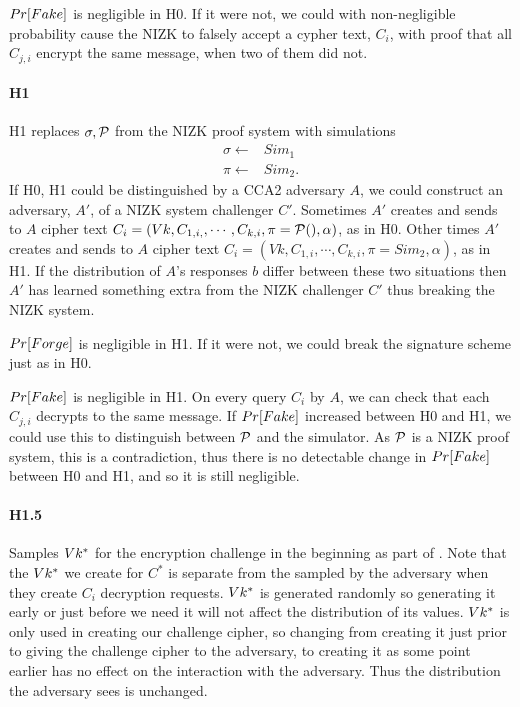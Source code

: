 $Pr[Fake]$ is negligible in H0. If it were not, we could with non-negligible probability cause the NIZK \Verify
to falsely accept a cypher text, $C_i$, with proof that all $C_{j,i}$ encrypt the same message, when two of them did not.


\paragraph{H1} H1 replaces $\sigma, \mathcal{P}$ from the NIZK proof system with simulations
\begin{align*}
\sigma \leftarrow & Sim_1 \\
\pi        \leftarrow & Sim_2.
\end{align*}
If H0, H1 could be distinguished by a CCA2 adversary $A$,
we could construct an adversary, $A'$, of a NIZK system challenger $C'$.
Sometimes $A'$ creates and sends to $A$ cipher text $C_i = (Vk, C_{1,i,}, \cdots, C_{k,i}, \pi = \mathcal{P}(), \alpha)$, as in H0.
Other times $A'$ creates and sends to $A$ cipher text $C_i = (Vk, C_{1,i}, \cdots, C_{k,i}, \pi = Sim_2, \alpha)$, as in H1.
If the distribution of $A$'s responses $b$ differ between these two situations then $A'$
has learned something extra from the NIZK challenger $C'$ thus breaking the NIZK system.

$Pr[Forge]$ is negligible in H1. If it were not,
we could break the signature scheme just as in H0.

$Pr[Fake]$  is negligible in H1.
On every query $C_i$ by $A$, we can check that each $C_{j,i}$ decrypts to the same message.
If $Pr[Fake]$ increased between H0 and H1, we could use this to distinguish between $\mathcal{P}$ and the simulator.
As $\mathcal{P}$ is a NIZK proof system, this is a contradiction, thus there is no detectable change in $Pr[Fake]$
between H0 and H1, and so it is still negligible.


\paragraph{H1.5}
Samples $Vk^*$ for the encryption challenge in the beginning as part of \Setup.
Note that the $Vk^*$ we create for $C^*$ is separate from the
\Vk sampled by the adversary when they create $C_i$ decryption requests.
$Vk^*$ is generated randomly so generating it early or just before we need it will not affect the distribution of its values.
$Vk ^*$ is only used in creating our challenge cipher,
so changing from creating it just prior to giving the challenge cipher to the adversary,
to creating it as some point earlier has no effect on the interaction with the adversary.
Thus the distribution the adversary sees is unchanged.

